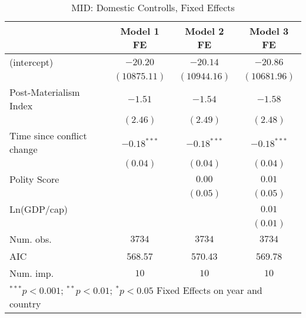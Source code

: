 
\begin{table}
\begin{center}
\begin{tabular}{l c c c}
\toprule
 & Model 1 FE & Model 2 FE & Model 3 FE \\
\midrule
(intercept)                & $-20.20$      & $-20.14$      & $-20.86$      \\
                           & $(10875.11)$  & $(10944.16)$  & $(10681.96)$  \\
Post-Materialism Index     & $-1.51$       & $-1.54$       & $-1.58$       \\
                           & $(2.46)$      & $(2.49)$      & $(2.48)$      \\
Time since conflict change & $-0.18^{***}$ & $-0.18^{***}$ & $-0.18^{***}$ \\
                           & $(0.04)$      & $(0.04)$      & $(0.04)$      \\
Polity Score               &               & $0.00$        & $0.01$        \\
                           &               & $(0.05)$      & $(0.05)$      \\
Ln(GDP/cap)                &               &               & $0.01$        \\
                           &               &               & $(0.01)$      \\
\midrule
Num. obs.                  & $3734$        & $3734$        & $3734$        \\
AIC                        & 568.57        & 570.43        & 569.78        \\
Num. imp.                  & $10$          & $10$          & $10$          \\
\bottomrule
\multicolumn{4}{l}{\scriptsize{ $^{***}p<0.001$; $^{**}p<0.01$; $^{*}p<0.05$ 
 Fixed Effects on year and country}}
\end{tabular}
\caption{MID: Domestic Controlls, Fixed Effects}
\label{MID_1_FE_PM}
\end{center}
\end{table}
